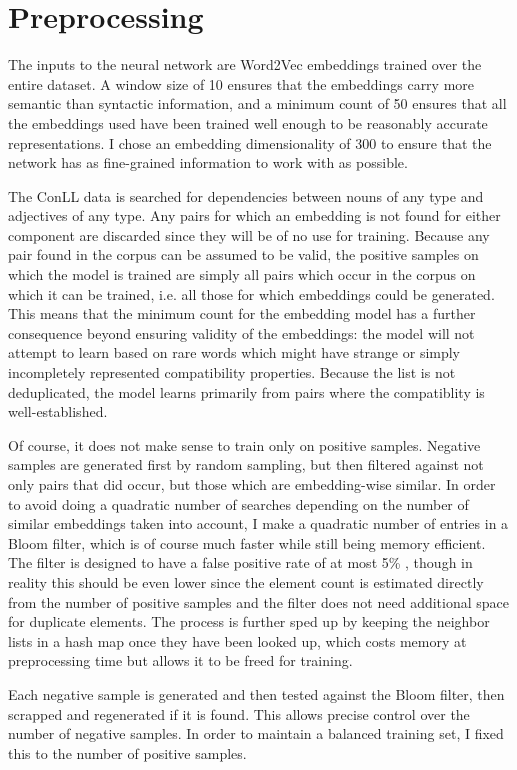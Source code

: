 \documentclass{article}
\begin{document}
\section{Preprocessing}

The inputs to the neural network are Word2Vec embeddings trained over the entire dataset. A window size of 10 ensures that the embeddings carry more semantic than syntactic information, and a minimum count of 50 ensures that all the embeddings used have been trained well enough to be reasonably accurate representations. I chose an embedding dimensionality of 300 to ensure that the network has as fine-grained information to work with as possible.

The ConLL data is searched for dependencies between nouns of any type and adjectives of any type. Any pairs for which an embedding is not found for either component are discarded since they will be of no use for training. Because any pair found in the corpus can be assumed to be valid, the positive samples on which the model is trained are simply all pairs which occur in the corpus on which it can be trained, i.e. all those for which embeddings could be generated. This means that the minimum count for the embedding model has a further consequence beyond ensuring validity of the embeddings: the model will not attempt to learn based on rare words which might have strange or simply incompletely represented compatibility properties. Because the list is not deduplicated, the model learns primarily from pairs where the compatiblity is well-established.

Of course, it does not make sense to train only on positive samples. Negative samples are generated first by random sampling, but then filtered against not only pairs that did occur, but those which are embedding-wise similar. In order to avoid doing a quadratic number of searches depending on the number of similar embeddings taken into account, I make a quadratic number of entries in a Bloom filter, which is of course much faster while still being memory efficient. The filter is designed to have a false positive rate of at most 5\% , though in reality this should be even lower since the element count is estimated directly from the number of positive samples and the filter does not need additional space for duplicate elements. The process is further sped up by keeping the neighbor lists in a hash map once they have been looked up, which costs memory at preprocessing time but allows it to be freed for training.

Each negative sample is generated and then tested against the Bloom filter, then scrapped and regenerated if it is found. This allows precise control over the number of negative samples. In order to maintain a balanced training set, I fixed this to the number of positive samples.
\end{document}
